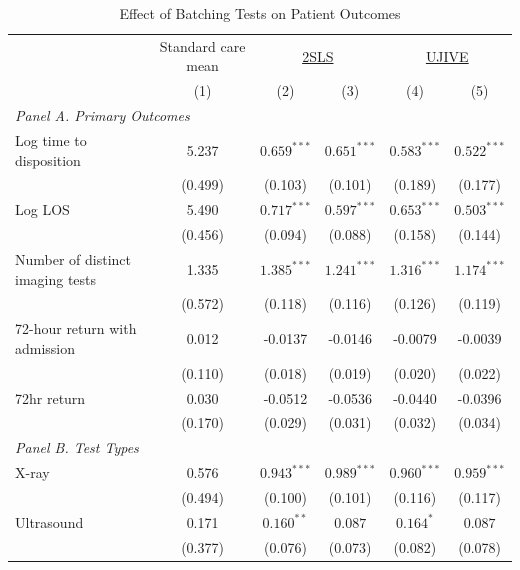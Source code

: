 \documentclass[,,blindrev]{informs}
\begin{document}
\begin{table}[t!]
\centering
\caption{Effect of Batching Tests on Patient Outcomes}
\label{tab:results_table}
\begin{threeparttable}
\begin{tabular}{lccccc}
\toprule
& Standard care mean & \multicolumn{2}{c}{\underline{2SLS}} & \multicolumn{2}{c}{\underline{UJIVE}} \\
& (1) & (2) & (3) & (4) & (5) \\
\midrule

\multicolumn{6}{l}{\textit{Panel A. Primary Outcomes}} \\[0.5em]

Log time to disposition 
& 5.237 
& $0.659^{***}$ & $0.651^{***}$
& $0.583^{***}$ & $0.522^{***}$ \\
& (0.499)
& (0.103) & (0.101)
& (0.189) & (0.177) \\[0.5em]

Log LOS
& 5.490
& $0.717^{***}$ & $0.597^{***}$
& $0.653^{***}$ & $0.503^{***}$ \\
& (0.456)
& (0.094) & (0.088)
& (0.158) & (0.144) \\[0.5em]

Number of distinct imaging tests 
& 1.335
& $1.385^{***}$ & $1.241^{***}$
& $1.316^{***}$ & $1.174^{***}$ \\
& (0.572)
& (0.118) & (0.116)
& (0.126) & (0.119) \\[0.5em]

72-hour return with admission 
& 0.012
& -0.0137 & -0.0146
& -0.0079 & -0.0039 \\
& (0.110)
& (0.018) & (0.019)
& (0.020) & (0.022) \\[0.5em]

72hr return 
& 0.030
& -0.0512 & -0.0536
& -0.0440 & -0.0396 \\
& (0.170)
& (0.029) & (0.031)
& (0.032) & (0.034) \\[0.5em]


\multicolumn{6}{l}{\textit{Panel B. Test Types}} \\[0.5em]

X-ray 
& 0.576
& $0.943^{***}$ & $0.989^{***}$
& $0.960^{***}$ & $0.959^{***}$ \\
& (0.494)
& (0.100) & (0.101)
& (0.116) & (0.117) \\[0.5em]

Ultrasound 
& 0.171
& $0.160^{**}$ & $0.087$
& $0.164^{*}$ & $0.087$ \\
& (0.377)
& (0.076) & (0.073)
& (0.082) & (0.078) \\[0.5em]


\end{tabular}
\end{threeparttable}
\end{table}
\end{document}
